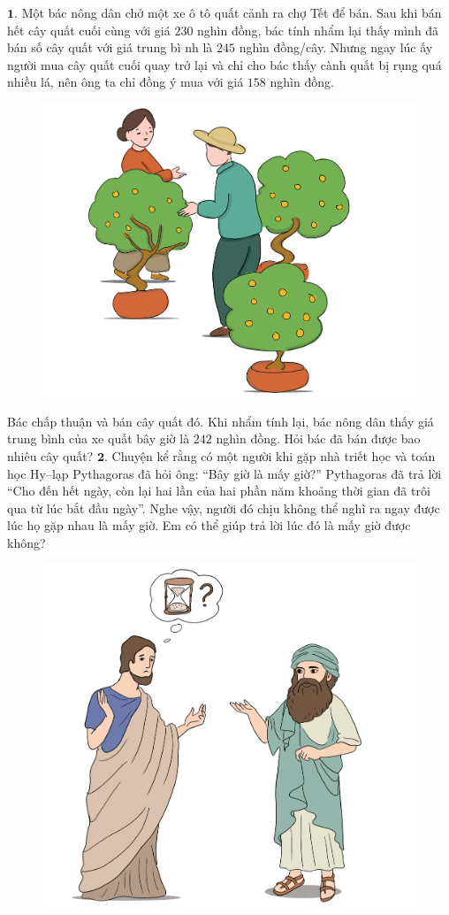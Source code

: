 \begin{multicols}{2}
	$\pmb{1.}$ Một bác nông dân chở một xe ô tô quất cảnh ra chợ Tết để bán. Sau khi bán hết cây quất cuối cùng với giá $230$ nghìn đồng, bác tính nhẩm lại thấy mình đã bán số cây quất với giá trung bì nh là $245$ nghìn đồng/cây. Nhưng ngay lúc ấy người mua cây quất cuối quay trở lại và chỉ cho bác thấy cành quất bị rụng quá nhiều lá, nên ông ta chỉ đồng ý mua với giá $158$ nghìn đồng. 
	\begin{figure}[H]
		\centering
		\vspace*{5pt}
		\captionsetup{labelformat= empty, justification=centering}
		\includegraphics[width=0.8\linewidth]{Pi1_2_Bai1}
		\vspace*{-5pt}
	\end{figure}
	Bác chấp thuận và bán cây quất đó. Khi nhẩm tính lại, bác nông dân thấy giá trung bình của xe quất bây giờ là $242$ nghìn đồng. Hỏi bác đã bán được bao nhiêu cây quất?
	\vskip 0.1cm
	$\pmb{2.}$ Chuyện kể rằng có một người khi gặp nhà triết học và toán học Hy--lạp Pythagoras đã hỏi ông: “Bây giờ là mấy giờ?” Pythagoras đã trả lời “Cho đến hết ngày, còn lại hai lần của hai phần năm khoảng thời gian đã trôi qua từ lúc bắt đầu ngày”. Nghe vậy, người đó chịu không thể nghĩ ra ngay được lúc họ gặp nhau là mấy giờ. Em có thể giúp trả lời lúc đó là mấy giờ được không?
	\begin{figure}[H]
		\centering
		\vspace*{-5pt}
		\captionsetup{labelformat= empty, justification=centering}
		\includegraphics[width=0.7\linewidth]{Pi1_2_Bai2}

\end{figure}
\end{multicols}
